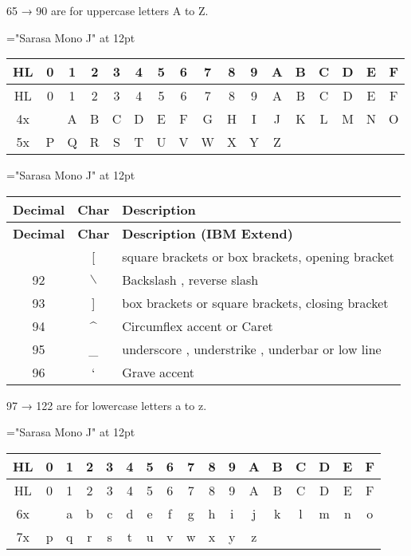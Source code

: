 65 → 90 are for uppercase letters A to Z.

{\font\rm="Sarasa Mono J" at 12pt \rm 
\begin{longtable}{|c|c|c|c|c|c|c|c|c|c|c|c|c|c|c|c|c|}
	\hline
	HL&0&1&2&3&4&5&6&7&8&9&A&B&C&D&E&F\\\hline
	\endfirsthead\hline
	HL&0&1&2&3&4&5&6&7&8&9&A&B&C&D&E&F\\\hline
	\endhead\hline\endfoot\hline\endlastfoot
4x& &A&B&C&D&E&F&G&H&I&J&K&L&M&N&O\\\hline
5x&P&Q&R&S&T&U&V&W&X&Y&Z& & & & & \\\hline
\end{longtable}
}

{\font\rm="Sarasa Mono J" at 12pt \rm 
\begin{center}\begin{longtable}{|c|c|l|}
	\hline
	\textbf{Decimal} & \textbf{Char} & \textbf{Description} \\
	\hline\endfirsthead\hline
	\textbf{Decimal} & \textbf{Char} & \textbf{Description (IBM Extend)} \\
	\hline\endhead\hline\endfoot\hline\endlastfoot
91 & [ & square brackets or box brackets, opening bracket \\\hline
92 &$\backslash$& Backslash , reverse slash \\\hline
93 & ] & box brackets or square brackets, closing bracket \\\hline
94 & \^{}& Circumflex accent or Caret \\\hline
95 & \_& underscore , understrike , underbar or low line \\\hline
96 & ` & Grave accent \\\hline
\end{longtable}\end{center}
}

97 → 122 are for lowercase letters a to z.

{\font\rm="Sarasa Mono J" at 12pt \rm 
\begin{longtable}{|c|c|c|c|c|c|c|c|c|c|c|c|c|c|c|c|c|}
	\hline
	HL&0&1&2&3&4&5&6&7&8&9&A&B&C&D&E&F\\\hline
	\endfirsthead\hline
	HL&0&1&2&3&4&5&6&7&8&9&A&B&C&D&E&F\\\hline
	\endhead\hline\endfoot\hline\endlastfoot
6x& &a&b&c&d&e&f&g&h&i&j&k&l&m&n&o\\\hline
7x&p&q&r&s&t&u&v&w&x&y&z& & & & & \\\hline
\end{longtable}
}

